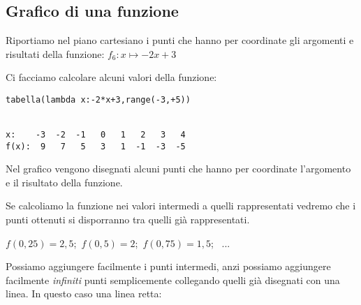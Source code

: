 \subsection{Grafico di una funzione}

Riportiamo nel piano cartesiano i punti che hanno per coordinate gli 
argomenti e risultati della funzione: \quad \(f_6: x \mapsto -2x+3\) 

\vspace{1em}
\begin{minipage}{.49\textwidth}
Ci facciamo calcolare alcuni valori della funzione:

\begin{lstlisting}
tabella(lambda x:-2*x+3,range(-3,+5))


x:    -3  -2  -1   0   1   2   3   4
f(x):  9   7   5   3   1  -1  -3  -5
\end{lstlisting}
\begin{center}
\end{center}
\end{minipage}
\begin{minipage}{.49\textwidth}
\begin{center} \scalebox{.6}{\graficoa} \end{center}
\end{minipage}

Nel grafico vengono disegnati alcuni punti che hanno per coordinate 
l'argomento e il risultato della funzione.

Se calcoliamo la funzione nei valori intermedi a quelli rappresentati 
vedremo che i punti ottenuti si disporranno tra quelli già rappresentati. 

\(f(0,25)=2,5\);~\(f(0,5)=2\);~\(f(0,75)=1,5\);~  ...

Possiamo aggiungere facilmente i punti intermedi, anzi possiamo aggiungere 
facilmente \emph{infiniti} punti semplicemente collegando quelli già 
disegnati con una linea. In questo caso una linea retta:

